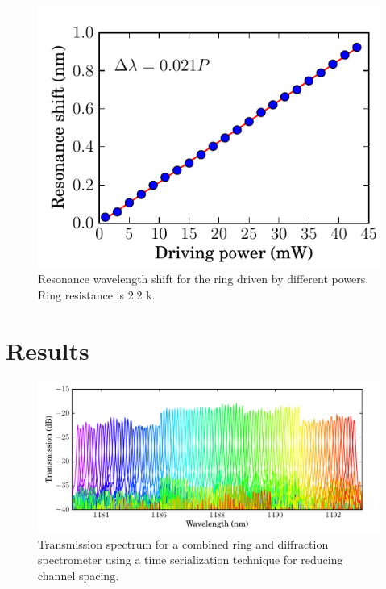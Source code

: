 \documentclass[12pt,twoside,english]{book}
\renewcommand{\~}{\perispomeni}%
\DeclareRobustCommand{\textgreek}[1]{\leavevmode{\greektext #1}}
\numberwithin{equation}{section}
\numberwithin{figure}{section}
\begin{document}
\begin{figure}[H]
	\begin{minipage}[t]{0.49\columnwidth}%
		\includegraphics{ring-cal-fit}\caption{Resonance wavelength shift for the ring driven by different powers. Ring resistance is 2.2 k\textgreek{W}.\label{fig:resonance shift resistance}}
	\end{minipage}
\end{figure}

\section{Results}
\begin{figure}[H]
\noindent \centering{}
\includegraphics{graphs/hundred}
\caption{Transmission spectrum for a combined ring and diffraction spectrometer using a time serialization technique for reducing channel spacing.}
\label{fig:Transmission spectrum}
\end{figure}
\end{document}
